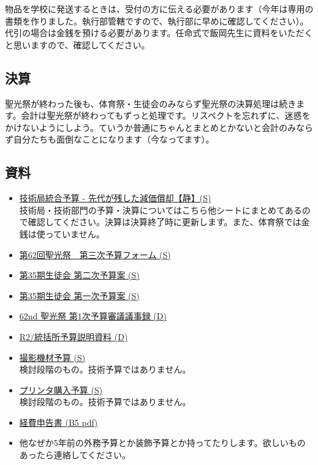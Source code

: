 \documentclass[dvipdfmx,jb5]{jarticle}
\begin{document}
物品を学校に発送するときは、受付の方に伝える必要があります（今年は専用の書類を作りました。執行部管轄ですので、執行部に早めに確認してください）。代引の場合は金銭を預ける必要があります。任命式で飯岡先生に資料をいただくと思いますので、確認してください。

\subsection{決算}
聖光祭が終わった後も、体育祭・生徒会のみならず聖光祭の決算処理は続きます。会計は聖光祭が終わってもずっと処理です。リスペクトを忘れずに、迷惑をかけないようにしよう。ていうか普通にちゃんとまとめとかないと会計のみならず自分たちも面倒なことになります（今なってます）。

\subsection{資料}
\begin{itemize}
  \item \href{https://docs.google.com/spreadsheets/d/1cCHlfuN5FRR4mlCLDqwohB5WyJ2stmBoUM762DVa7aM/edit##gid=848718781}{技術局統合予算 - 先代が残した減価償却【静】(S)}
  \\ 技術局・技術部門の予算・決算についてはこちら他シートにまとめてあるので確認してください。決算は決算終了時に更新します。また、体育祭では金銭は使っていません。
  \item \href{https://docs.google.com/spreadsheets/d/1Tg_4jKLywMSQpIjNebaPKgTH9YmPqoLZAOGBRs1sr7I/edit?usp=sharing}{第62回聖光祭　第三次予算フォーム (S)}
  \item \href{https://docs.google.com/spreadsheets/d/1zZcA076Hvox9dDIvhHAMnmiIAQI0af1ChN1slH4WyVw/edit?usp=sharing}{第35期生徒会 第二次予算案 (S)}
  \item \href{https://docs.google.com/spreadsheets/d/1uNOAvcq1S3ErZTklh8G7kT6zPYlna-8pR9Jqv2RYYKc/edit?usp=sharing}{第35期生徒会 第一次予算案 (S)}
  \item \href{https://docs.google.com/document/d/1hR_gEl9qHiXGgSxzFDBNH7U6hyPKhjvPEHOStIhGmo8/edit?usp=sharing}{62nd 聖光祭 第1次予算審議議事録 (D)}
  \item \href{https://docs.google.com/document/d/1brt8Fwv7bYzFQlV_zTF3Tmtmhg8zD4gGt-oBMQM-7Iw/edit?usp=sharing}{R2/統括所予算説明資料 (D)}
  \item \href{https://docs.google.com/spreadsheets/d/1tlZiJdgfzjbsGDRE5cx0bnHmj2DNoOukDPuPQMx2N5g/edit?usp=sharing}{撮影機材予算 (S)}
  \\検討段階のもの。技術予算ではありません。
  \item \href{https://docs.google.com/spreadsheets/d/1-HWo9Lh8epNt7tHbg88feTvWC146bmrN0XXh0YFmPzU/edit?usp=sharing}{プリンタ購入予算 (S)}
  \\検討段階のもの。技術予算ではありません。
  \item \href{https://drive.google.com/file/d/1TN5O2NX7dg8xD_-Y-93Du-caYc1XWezX/view?usp=sharing}{経費申告書 (B5 pdf)}
  \item 他なぜか5年前の外務予算とか装飾予算とか持ってたりします。欲しいものあったら連絡してください。
\end{itemize}
\end{document}

